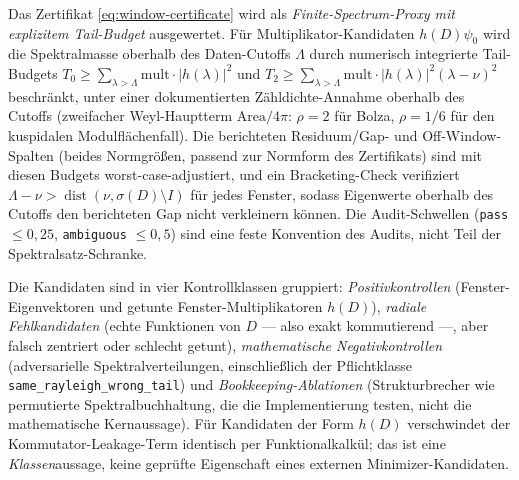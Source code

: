 \documentclass[12pt,a4paper]{article}
\theoremstyle{definition}
\theoremstyle{remark}
\begin{document}
Das Zertifikat \eqref{eq:window-certificate} wird als
\emph{Finite-Spectrum-Proxy mit explizitem Tail-Budget} ausgewertet. Für
Multiplikator-Kandidaten $h(D)\psi_0$ wird die Spektralmasse oberhalb des
Daten-Cutoffs $\Lambda$ durch numerisch integrierte Tail-Budgets
$T_0 \ge \sum_{\lambda>\Lambda}\mathrm{mult}\cdot|h(\lambda)|^2$ und
$T_2 \ge \sum_{\lambda>\Lambda}\mathrm{mult}\cdot|h(\lambda)|^2(\lambda-\nu)^2$
beschränkt, unter einer dokumentierten Zähldichte-Annahme oberhalb des
Cutoffs (zweifacher Weyl-Hauptterm $\mathrm{Area}/4\pi$: $\rho=2$ für Bolza,
$\rho=1/6$ für den kuspidalen Modulflächenfall). Die berichteten
Residuum/Gap- und Off-Window-Spalten (beides Normgrößen, passend zur
Normform des Zertifikats) sind mit diesen Budgets worst-case-adjustiert, und ein Bracketing-Check verifiziert
$\Lambda-\nu > \operatorname{dist}(\nu,\sigma(D)\setminus I)$ für jedes
Fenster, sodass Eigenwerte oberhalb des Cutoffs den berichteten Gap nicht
verkleinern können. Die Audit-Schwellen (\texttt{pass} $\le 0{,}25$,
\texttt{ambiguous} $\le 0{,}5$) sind eine feste Konvention des Audits, nicht
Teil der Spektralsatz-Schranke.

Die Kandidaten sind in vier Kontrollklassen gruppiert:
\emph{Positivkontrollen} (Fenster-Eigenvektoren und getunte
Fenster-Multiplikatoren $h(D)$), \emph{radiale Fehlkandidaten} (echte
Funktionen von $D$ --- also exakt kommutierend ---, aber falsch zentriert
oder schlecht getunt), \emph{mathematische Negativkontrollen} (adversarielle
Spektralverteilungen, einschließlich der Pflichtklasse
\texttt{same\_rayleigh\_}\allowbreak\texttt{wrong\_tail}) und
\emph{Bookkeeping-Ablationen} (Strukturbrecher wie permutierte
Spektralbuchhaltung, die die Implementierung testen, nicht die
mathematische Kernaussage). Für Kandidaten der Form $h(D)$ verschwindet der
Kommutator-Leakage-Term identisch per Funktionalkalkül; das ist eine
\emph{Klassen}aussage, keine geprüfte Eigenschaft eines externen
Minimizer-Kandidaten.
\end{document}
